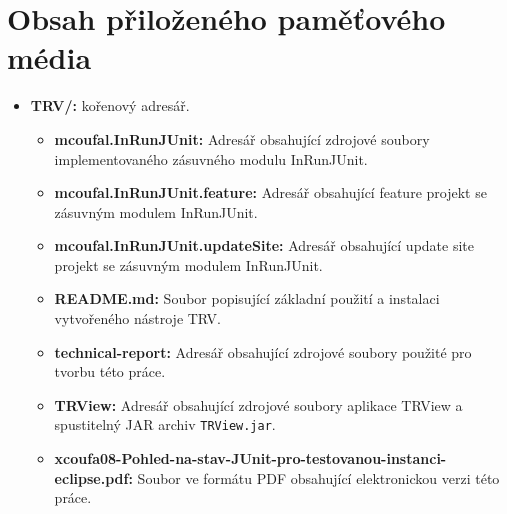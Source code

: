 \chapter{Obsah přiloženého paměťového média}
\label{jak}

\begin{itemize}
 \item {\LARGE \textbf{TRV/:} kořenový adresář.}
    {\Large \begin{itemize}
     \item \textbf{mcoufal.InRunJUnit:}
	Adresář obsahující zdrojové soubory implementovaného zásuvného modulu InRunJUnit.
     \item \textbf{mcoufal.InRunJUnit.feature:}
	Adresář obsahující feature projekt se zásuvným modulem InRunJUnit.
     \item \textbf{mcoufal.InRunJUnit.updateSite:}
	Adresář obsahující update site projekt se zásuvným modulem InRunJUnit.
     \item \textbf{README.md:}
	Soubor popisující základní použití a instalaci vytvořeného nástroje TRV.
     \item \textbf{technical-report:}
	Adresář obsahující zdrojové soubory použité pro tvorbu této práce.
     \item \textbf{TRView:}
	Adresář obsahující zdrojové soubory aplikace TRView a spustitelný JAR archiv \texttt{TRView.jar}.
     \item \textbf{xcoufa08-Pohled-na-stav-JUnit-pro-testovanou-instanci-eclipse.pdf:}
	Soubor ve formátu PDF obsahující elektronickou verzi této práce.
    \end{itemize}}
\end{itemize}



